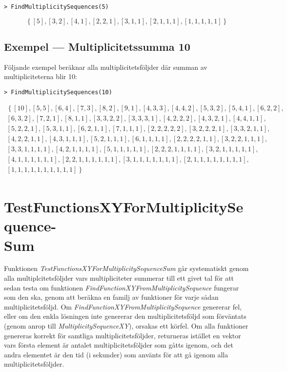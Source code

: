 \begin{verbatim}
> FindMultiplicitySequences(5)
\end{verbatim}
\[\left\{[5], [3,2], [4,1], [2,2,1], [3,1,1], [2,1,1,1], [1,1,1,1,1]\right\}\]

\subsection{Exempel --- Multiplicitetssumma 10}

Följande exempel beräknar alla multiplicitetsföljder där summan av multipliciteterna blir 10:

\begin{verbatim}
> FindMultiplicitySequences(10)
\end{verbatim}
\[
\begin{array}{l}
\left\{[10], [5,5], [6,4], [7,3], [8,2], [9,1], [4,3,3], [4,4,2], [5,3,2], [5,4,1], [6,2,2],\right.\\
\left[6,3,2\right], [7,2,1], [8,1,1], [3,3,2,2], [3,3,3,1], [4,2,2,2], [4,3,2,1], [4,4,1,1], \\
\left[5,2,2,1\right], [5,3,1,1], [6,2,1,1], [7,1,1,1], [2,2,2,2,2], [3,2,2,2,1], [3,3,2,1,1], \\
\left[4,2,2,1,1\right], [4,3,1,1,1], [5,2,1,1,1], [6,1,1,1,1], [2,2,2,2,1,1], [3,2,2,1,1,1], \\
\left[3,3,1,1,1,1\right], [4,2,1,1,1,1], [5,1,1,1,1,1], [2,2,2,1,1,1,1], [3,2,1,1,1,1,1], \\
\left[4,1,1,1,1,1,1\right], [2,2,1,1,1,1,1,1], [3,1,1,1,1,1,1,1], [2,1,1,1,1,1,1,1,1], \\
\left.[1,1,1,1,1,1,1,1,1,1]\right\}\\
\end{array}
\]

\section{TestFunctionsXYForMultiplicitySequence-\\
	Sum}

Funktionen \emph{TestFunctionsXYForMultiplicitySequenceSum} går systematiskt genom alla multiplcitetsföljder vars multipliciteter summerar till ett givet tal för att sedan testa om funktionen \emph{FindFunctionXYFromMultiplicitySequence} fungerar som den ska, genom att beräkna en familj av funktioner för varje sådan multiplicitetsföljd. Om \emph{FindFunctionXYFromMultiplicitySequence} genererar fel, eller om den enkla lösningen inte genererar den multiplicitetsföljd som förväntats (genom anrop till \emph{MultiplicitySequenceXY}), orsakas ett körfel. Om alla funktioner genereras korrekt för samtliga multiplicitetsföljder, returneras istället en vektor vars första element är antalet multiplicitetsföljder som gåtts igenom, och det andra elementet är den tid (i sekunder) som använts för att gå igenom alla multiplicitetsföljder.

